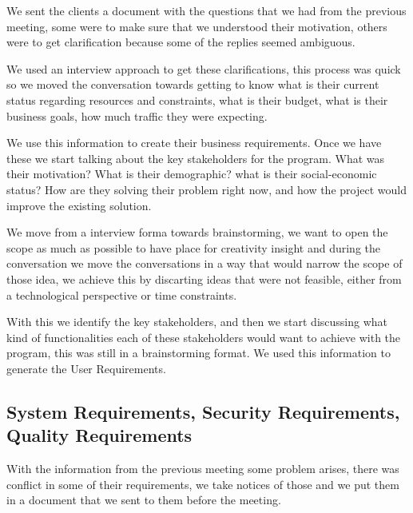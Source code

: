 \noindent We sent the clients a document with the questions that we had from 
the previous meeting, some were to make sure that we understood their 
motivation, others were to get clarification because some of the replies 
seemed ambiguous.\newline

\noindent We used an interview approach to get these clarifications, this 
process was quick so we moved the conversation towards getting to know what is 
their current status regarding resources and constraints, what is their budget, 
what is their business goals, how much traffic they were expecting.\newline

\noindent We use this information to create their business requirements. Once 
we have these we start talking about the key stakeholders for the program. What 
was their motivation? What is their demographic? what is their social-economic 
status? How are they solving their problem right now, and how the project 
would improve the existing solution.\newline

\noindent We move from a interview forma towards brainstorming, we want to open 
the scope as much as possible to have place for creativity insight and during 
the conversation we move the conversations in a way that would narrow the scope 
of those idea, we achieve this by discarting ideas that were not feasible, 
either from a technological perspective or time constraints.

\pagebreak

\noindent With this we identify the key stakeholders, and then we start 
discussing what kind of functionalities each of these stakeholders would want 
to achieve with the program, this was still in a brainstorming format. We used 
this information to generate the User Requirements.

\subsection{System Requirements, Security Requirements, Quality Requirements}
With the information from the previous meeting some problem arises, there was 
conflict in some of their requirements, we take notices of those and we put 
them in a document that we sent to them before the meeting. \newline

